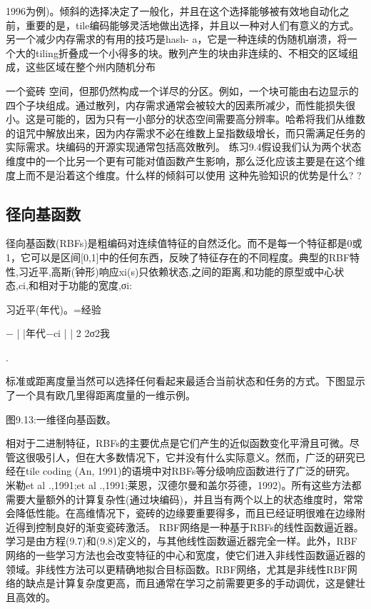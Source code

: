 {1996为例)。倾斜的选择决定了一般化，并且在这个选择能够被有效地自动化之前，重要的是，tile编码能够灵活地做出选择，并且以一种对人们有意义的方式。
另一个减少内存需求的有用的技巧是hash- a，它是一种连续的伪随机崩溃，将一个大的tiling折叠成一个小得多的块。散列产生的块由非连续的、不相交的区域组成，这些区域在整个州内随机分布




一个瓷砖
空间，但那仍然构成一个详尽的分区。例如，一个块可能由右边显示的四个子块组成。通过散列，内存需求通常会被较大的因素所减少，而性能损失很小。这是可能的，因为只有一小部分的状态空间需要高分辨率。哈希将我们从维数的诅咒中解放出来，因为内存需求不必在维数上呈指数级增长，而只需满足任务的实际需求。块编码的开源实现通常包括高效散列。
练习9.4假设我们认为两个状态维度中的一个比另一个更有可能对值函数产生影响，那么泛化应该主要是在这个维度上而不是沿着这个维度。什么样的倾斜可以使用
这种先验知识的优势是什么? 					?


\subsection{径向基函数}
径向基函数(RBFs)是粗编码对连续值特征的自然泛化。而不是每一个特征都是0或1，它可以是区间[0,1]中的任何东西，反映了特征存在的不同程度。典型的RBF特性,习近平,高斯(钟形)响应xi(s)只依赖状态,之间的距离,和功能的原型或中心状态,ci,和相对于功能的宽度,σi:

习近平(年代)。=经验

−
| |年代−ci | | 2
2σ2我

.




标准或距离度量当然可以选择任何看起来最适合当前状态和任务的方式。下图显示了一个具有欧几里得距离度量的一维示例。
 
图9.13:一维径向基函数。

相对于二进制特征，RBFs的主要优点是它们产生的近似函数变化平滑且可微。尽管这很吸引人，但在大多数情况下，它并没有什么实际意义。然而，广泛的研究已经在tile coding (An, 1991)的语境中对RBFs等分级响应函数进行了广泛的研究。米勒et al .,1991;et al .,1991;莱恩，汉德尔曼和盖尔芬德，1992)。所有这些方法都需要大量额外的计算复杂性(通过块编码)，并且当有两个以上的状态维度时，常常会降低性能。在高维情况下，瓷砖的边缘要重要得多，而且已经证明很难在边缘附近得到控制良好的渐变瓷砖激活。
RBF网络是一种基于RBFs的线性函数逼近器。学习是由方程(9.7)和(9.8)定义的，与其他线性函数逼近器完全一样。此外，RBF网络的一些学习方法也会改变特征的中心和宽度，使它们进入非线性函数逼近器的领域。非线性方法可以更精确地拟合目标函数。RBF网络，尤其是非线性RBF网络的缺点是计算复杂度更高，而且通常在学习之前需要更多的手动调优，这是健壮且高效的。


}
